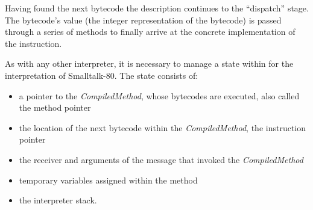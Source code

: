 Having found the next bytecode the description continues to the \enquote{dispatch} stage. The bytecode's value (the integer representation of the bytecode) is passed through a series of methods to finally arrive at the concrete implementation of the instruction. 

As with any other interpreter, it is necessary to manage a state within for the interpretation of Smalltalk-80.
The state consists of:
\begin{itemize}
  \item a pointer to the \emph{CompiledMethod}, whose bytecodes are executed, also called the method pointer
  \item the location of the next bytecode within the \emph{CompiledMethod}, the instruction pointer 
  \item the receiver and arguments of the message that invoked the \emph{CompiledMethod}
  \item temporary variables assigned within the method 
  \item the interpreter stack.
\end{itemize}


